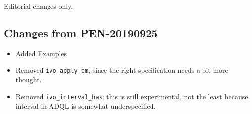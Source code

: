 \documentclass[11pt,a4paper]{ivoa}
\begin{document}
Editorial changes only.

\subsection{Changes from PEN-20190925}

\begin{itemize}
\item Added Examples
\item Removed \verb|ivo_apply_pm|, since the right specification needs a
bit more thought.
\item Removed \verb|ivo_interval_has|; this is still experimental, not
the least because interval in ADQL is somewhat underspecified.
\end{itemize}


\end{document}
